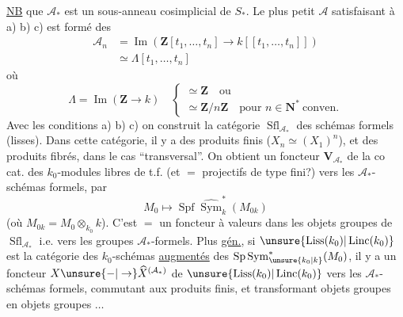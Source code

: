 \uline{NB}  que $\mathcal A_*$ est un sous-anneau cosimplicial de $S_*$. Le plus petit $\mathcal A$ satisfaisant à a) b) c) est formé des
\[
\begin{aligned}
\mathcal A_n&=\operatorname{Im}(\mathbf Z[t_1,\ldots,t_n]\longrightarrow k[[t_1,\ldots,t_n]])\\
&\simeq\Lambda[t_1,\ldots,t_n]
\end{aligned}
\]
où
\[
\Lambda=\operatorname{Im}(\mathbf Z\longrightarrow k)\quad
\left\{\begin{array}{l}\simeq\mathbf Z\quad\text{ou}\\\simeq\mathbf Z/n\mathbf Z\quad\text{pour }n\in\mathbf N^*\ \text{conven.}\end{array}\right.
\]
Avec les conditions a) b) c) on construit la catégorie  $\operatorname{Sfl}_{\mathcal A_*}$ des  schémas formels (lisses). Dans cette catégorie, il y a des produits finis ($X_n\simeq(X_1)^n$), et des produits fibrés, dans le cas ``transversal''.
On obtient un foncteur $\mathbf V_{\mathcal A_*}$ de la co cat. des $k_0$-modules libres de t.f. (et $=$ projectifs de type fini?) vers les $\mathcal A_*$-schémas formels, par
\[
M_0\longmapsto\operatorname{Spf}\widehat{\operatorname{Sym}}^*_k(M_{0k})
\]
(où $M_{0k}=M_0\otimes_{k_0}k$). C'est $=$ un foncteur à valeurs dans les objets groupes de $\operatorname{Sfl}_{\mathcal A_*}$ i.e. vers les groupes $\mathcal A_*$-formels.
Plus \uline{gén.}, si $\unsure{\operatorname{Liss}(k_0)|\operatorname{Linc}(k_0)}$ est la catégorie des $k_0$-schémas \uline{augmentés} \deleted{\unsure{$\xi$}} des \deleted{\unsure{$\xi$}} $\operatorname{Sp}\operatorname{Sym}^*_{\unsure{k_0|k}}(M_0)$,  il y a un foncteur $X\unsure{-|\to}\widehat X^{(\mathcal A_*)}$ de $\unsure{\operatorname{Liss}(k_0)|\operatorname{Linc}(k_0)}$ vers les $\mathcal A_*$-schémas formels, commutant aux produits finis, et transformant objets groupes en objets groupes $\ldots$
